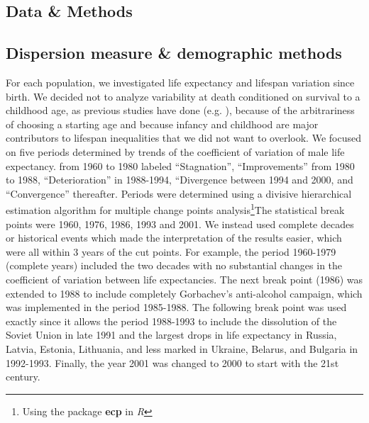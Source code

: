 \documentclass{article}
\begin{document}
\begin{spacing}{1.5}
\section*{Data \& Methods}

\subsection*{Dispersion measure \& demographic methods}

For each population, we investigated life expectancy and lifespan variation since birth. We decided not to analyze variability at death conditioned on survival to a childhood age, as previous studies have done (e.g. \citet{edwards2005, smits2009}), because of the arbitrariness of choosing a starting age and because infancy and childhood are major contributors to lifespan inequalities that we did not want to overlook.\textcolor[rgb]{1,0,0}{ We focused on five periods determined by trends of the coefficient of variation of male life expectancy. from 1960 to 1980 labeled ``Stagnation'', ``Improvements'' from 1980 to 1988, ``Deterioration'' in 1988-1994, ``Divergence between 1994 and 2000, and ``Convergence''  thereafter. Periods were determined using a divisive hierarchical estimation algorithm for multiple change points analysis\footnote{Using the package \textbf{ecp} in \textit{R}}The statistical break points were 1960, 1976, 1986, 1993 and 2001. We instead used complete decades or historical events which made the interpretation of the results easier, which were all within 3 years of the cut points. For example, the period 1960-1979 (complete years) included the two decades with no substantial changes in the coefficient of variation between life expectancies. The next break point (1986) was extended to 1988 to include completely Gorbachev’s anti-alcohol campaign, which was implemented in the period 1985-1988. The following break point was used exactly since it allows the period 1988-1993 to include the dissolution of the Soviet Union in late 1991 and the largest drops in life expectancy in Russia, Latvia, Estonia, Lithuania, and less marked in Ukraine, Belarus, and Bulgaria in 1992-1993. Finally, the year 2001 was changed to 2000 to start with the 21st century.}



\end{spacing}
\end{document}
